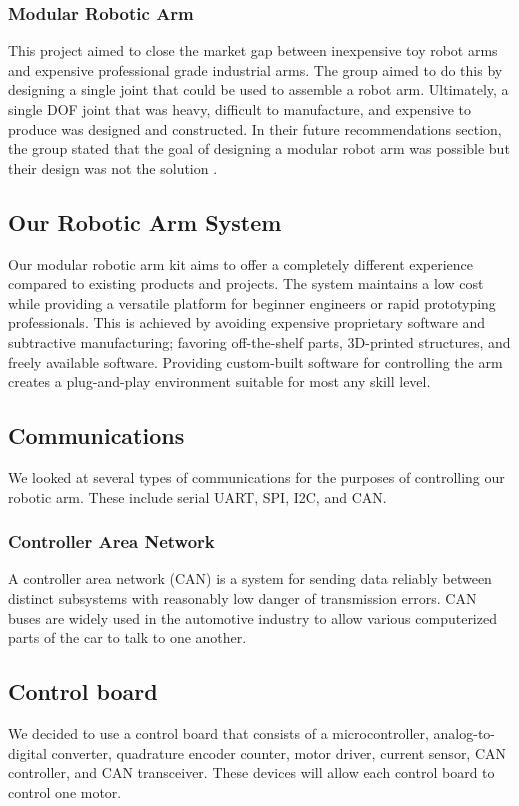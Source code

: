 \subsubsection{Modular Robotic Arm}
This project aimed to close the market gap between inexpensive toy robot arms and expensive professional grade industrial arms. The group aimed to do this by designing a single joint that could be used to assemble a robot arm. Ultimately, a single DOF joint that was heavy, difficult to manufacture, and expensive to produce was designed and constructed. In their future recommendations section, the group stated that the goal of designing a modular robot arm was possible but their design was not the solution \cite{MRA}.

\subsection{Our Robotic Arm System}
Our modular robotic arm kit aims to offer a completely different experience compared to existing products and projects. The system maintains a low cost while providing a versatile platform for beginner engineers or rapid prototyping professionals. This is achieved by avoiding expensive proprietary software and subtractive manufacturing; favoring off-the-shelf parts, 3D-printed structures, and freely available software. Providing custom-built software for controlling the arm creates a plug-and-play environment suitable for most any skill level.


\subsection{Communications}
We looked at several types of communications for the purposes of controlling our robotic arm. These include serial UART, SPI, I2C, and CAN. 
\subsubsection{Controller Area Network}
A controller area network (CAN) is a system for sending data reliably between distinct subsystems with reasonably low danger of transmission errors. CAN buses are widely used in the automotive industry to allow various computerized parts of the car to talk to one another.

\subsection{Control board}
We decided to use a control board that consists of a microcontroller, analog-to-digital converter, quadrature encoder counter, motor driver, current sensor, CAN controller, and CAN transceiver. These devices will allow each control board to control one motor.

